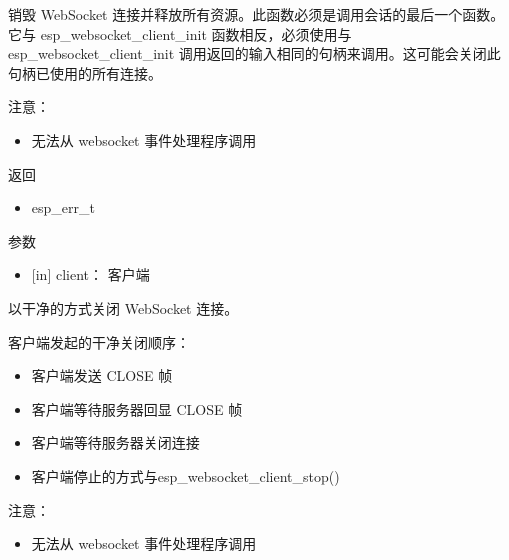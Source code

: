 \documentclass[a4paper,12pt,english]{sphinxmanual}
\begin{document}
{{\sphinxAtStartPar
销毁 WebSocket 连接并释放所有资源。此函数必须是调用会话的最后一个函数。它与 esp\_websocket\_client\_init 函数相反，必须使用与 esp\_websocket\_client\_init 调用返回的输入相同的句柄来调用。这可能会关闭此句柄已使用的所有连接。

\sphinxAtStartPar
注意：
\begin{itemize}
\item {} 
\sphinxAtStartPar
无法从 websocket 事件处理程序调用

\end{itemize}

\sphinxAtStartPar
返回
\begin{itemize}
\item {} 
\sphinxAtStartPar
esp\_err\_t

\end{itemize}

\sphinxAtStartPar
参数
\begin{itemize}
\item {} 
\sphinxAtStartPar
{[}in{]} client： 客户端

\end{itemize}

\begin{sphinxVerbatim}[commandchars=\\\{\}]
\end{sphinxVerbatim}

\sphinxAtStartPar
以干净的方式关闭 WebSocket 连接。

\sphinxAtStartPar
客户端发起的干净关闭顺序：
\begin{itemize}
\item {} 
\sphinxAtStartPar
客户端发送 CLOSE 帧

\item {} 
\sphinxAtStartPar
客户端等待服务器回显 CLOSE 帧

\item {} 
\sphinxAtStartPar
客户端等待服务器关闭连接

\item {} 
\sphinxAtStartPar
客户端停止的方式与esp\_websocket\_client\_stop()

\end{itemize}

\sphinxAtStartPar
注意：
\begin{itemize}
\item {} 
\sphinxAtStartPar
无法从 websocket 事件处理程序调用


\end{itemize}}}
\end{document}
